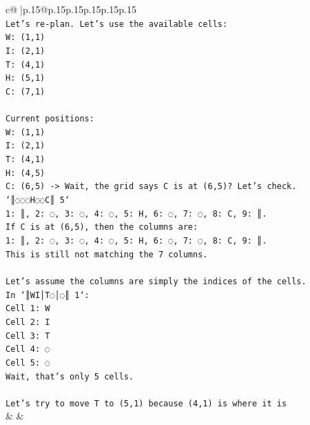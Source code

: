 \documentclass{article}
\begin{document}
{\begin{supertabular}{c@{$\;$}|p{.15\linewidth}@{}p{.15\linewidth}p{.15\linewidth}p{.15\linewidth}p{.15\linewidth}p{.15\linewidth}}
{{{\\ 
\texttt{Let's re{-}plan. Let's use the available cells:} \\
\texttt{W: (1,1)} \\
\texttt{I: (2,1)} \\
\texttt{T: (4,1)} \\
\texttt{H: (5,1)} \\
\texttt{C: (7,1)} \\
\\ 
\texttt{Current positions:} \\
\texttt{W: (1,1)} \\
\texttt{I: (2,1)} \\
\texttt{T: (4,1)} \\
\texttt{H: (4,5)} \\
\texttt{C: (6,5) {-}> Wait, the grid says C is at (6,5)? Let's check.} \\
\texttt{`║◌◌◌H◌◌C║ 5`} \\
\texttt{1: ║, 2: ◌, 3: ◌, 4: ◌, 5: H, 6: ◌, 7: ◌, 8: C, 9: ║.} \\
\texttt{If C is at (6,5), then the columns are:} \\
\texttt{1: ║, 2: ◌, 3: ◌, 4: ◌, 5: H, 6: ◌, 7: ◌, 8: C, 9: ║.} \\
\texttt{This is still not matching the 7 columns.} \\
\\ 
\texttt{Let's assume the columns are simply the indices of the cells.} \\
\texttt{In `║WI│T◌│◌║ 1`:} \\
\texttt{Cell 1: W} \\
\texttt{Cell 2: I} \\
\texttt{Cell 3: T} \\
\texttt{Cell 4: ◌} \\
\texttt{Cell 5: ◌} \\
\texttt{Wait, that's only 5 cells.} \\
\\ 
\texttt{Let's try to move T to (5,1) because (4,1) is where it is} \\
            }
        }
    }
    & & \\ \\


\end{supertabular}}
\end{document}
